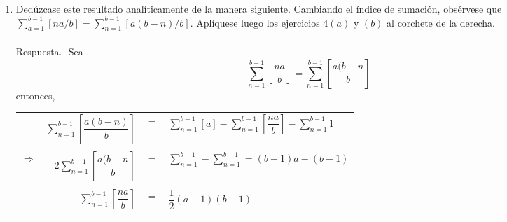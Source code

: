 \begin{enumerate}
\begin{enumerate}[\bfseries (a)]
	    \item Dedúzcase este resultado analíticamente de la manera siguiente. Cambiando el índice de sumación, obsérvese que $\sum\limits_{a=1}^{b-1}[na/b]=\sum\limits_{n=1}^{b-1}[a(b-n)/b]$. Aplíquese luego los ejercicios $4(a)$ y $(b)$  al corchete de la derecha.\\\\
		Respuesta.-\; Sea $$ \sum\limits_{n=1}^{b-1} \left[\dfrac{na}{b}\right] =  \sum\limits_{n=1}^{b-1} \left[\dfrac{a(b-n}{b}\right] $$
		entonces,
		\begin{center}
		    \begin{tabular}{crcl}
			&$\sum\limits_{n=1}^{b-1} \left[\dfrac{a(b-n)}{b}\right]$&$=$&$\sum\limits_{n=1}^{b-1} \left[a\right] - \sum\limits_{n=1}^{b-1} \left[\dfrac{na}{b}\right] - \sum\limits_{n=1}^{b-1} 1$\\\\
			$\Longrightarrow$&$2\sum\limits_{n=1}^{b-1} \left[\dfrac{a(b-n}{b}\right]$&$=$&$\sum\limits_{n=1}^{b-1} - \sum\limits_{n=1}^{b-1} = (b-1)a - (b-1)$\\\\
			&$\sum\limits_{n=1}^{b-1} \left[\dfrac{na}{b}\right]$&$=$&$\dfrac{1}{2}(a-1)(b-1)$\\\\
		    \end{tabular}
		\end{center}

	\end{enumerate} 


\end{enumerate}
